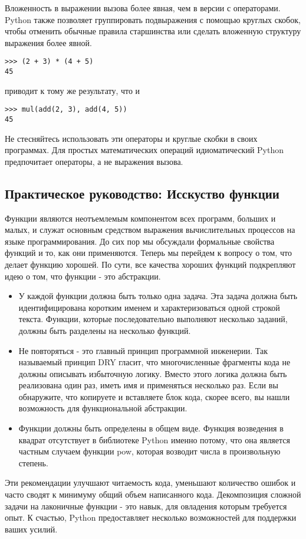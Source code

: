 Вложенность в выражении вызова более явная, чем в версии с операторами. Python также позволяет группировать подвыражения с помощью круглых скобок, чтобы отменить обычные правила старшинства или сделать вложенную структуру выражения более явной.
\begin{verbatim}
>>> (2 + 3) * (4 + 5)
45
\end{verbatim}

приводит к тому же результату, что и
\begin{verbatim}
>>> mul(add(2, 3), add(4, 5))
45
\end{verbatim}

Не стесняйтесь использовать эти операторы и круглые скобки в своих программах. Для простых математических операций идиоматический Python предпочитает операторы, а не выражения вызова.

\subsection{Практическое руководство: Исскуство функции}\label{subsec:-:--}
Функции являются неотъемлемым компонентом всех программ, больших и малых, и служат основным средством выражения вычислительных процессов на языке программирования.
До сих пор мы обсуждали формальные свойства функций и то, как они применяются.
Теперь мы перейдем к вопросу о том, что делает функцию хорошей. По сути, все качества хороших функций подкрепляют идею о том, что функции - это абстракции.

\begin{itemize}
  \item У каждой функции должна быть только одна задача. Эта задача должна быть идентифицирована коротким именем и характеризоваться одной строкой текста. Функции, которые последовательно выполняют несколько заданий, должны быть разделены на несколько функций.
  \item Не повторяться - это главный принцип программной инженерии. Так называемый принцип DRY гласит, что многочисленные фрагменты кода не должны описывать избыточную логику. Вместо этого логика должна быть реализована один раз, иметь имя и применяться несколько раз. Если вы обнаружите, что копируете и вставляете блок кода, скорее всего, вы нашли возможность для функциональной абстракции.
  \item Функции должны быть определены в общем виде. Функция возведения в квадрат отсутствует в библиотеке Python именно потому, что она является частным случаем функции pow, которая возводит числа в произвольную степень.
  \end{itemize}

Эти рекомендации улучшают читаемость кода, уменьшают количество ошибок и часто сводят к минимуму общий объем написанного кода. Декомпозиция сложной задачи на лаконичные функции - это навык, для овладения которым требуется опыт. К счастью, Python предоставляет несколько возможностей для поддержки ваших усилий.


